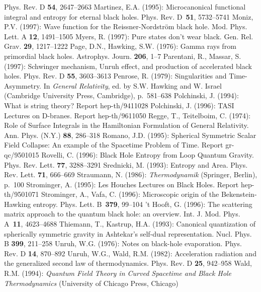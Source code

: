 \documentclass[12pt]{article}
\begin{document}
\begin{thebibliography}{999}
Phys. Rev. D {\bf 54}, 2647--2663
%
\bibitem{}{}{}
Martinez, E.A. (1995): Microcanonical functional integral and
entropy for eternal black holes. Phys. Rev. D~{\bf 51}, 5732--5741
%
\bibitem{}{}{}
Moniz, P.V. (1997): Wave function for the Reissner-Nordstr\"om
black hole. Mod. Phys. Lett. A {\bf 12}, 1491--1505
%
\bibitem{}{}{}
Myers, R. (1997): Pure states don't wear black. 
Gen. Rel. Grav. {\bf 29}, 1217--1222
%
\bibitem{}{}{}
Page, D.N., Hawking, S.W. (1976): Gamma rays from primordial
black holes. Astrophys. Journ. {\bf 206}, 1--7
%
\bibitem{}{}{}
Parentani, R., Massar, S. (1997): Schwinger mechanism, Unruh effect,
and production of accelerated black holes.
Phys. Rev. D {\bf 55}, 3603--3613
%
\bibitem{}{}{}
Penrose, R. (1979): Singularities and Time-Asymmetry.
In {\it General Relativity}, ed. by S.W. Hawking and W. Israel
(Cambridge University Press, Cambridge), p.~581--638
%
\bibitem{}{}{}
Polchinski, J. (1994): What is string theory? Report hep-th/9411028
%
\bibitem{}{}{}
Polchinski, J. (1996): TASI Lectures on D-branes. Report hep-th/9611050
%
\bibitem{}{}{}
Regge, T., Teitelboim, C. (1974): Role of Surface Integrals in the
Hamiltonian Formulation of General Relativity. Ann. Phys. (N.Y.)
{\bf 88}, 286--318
%
\bibitem{}{}{}
Romano, J.D. (1995): Spherical Symmetric Scalar Field Collapse:
An example of the Spacetime Problem of Time. Report gr-qc/9501015
%
\bibitem{}{}{}
Rovelli, C. (1996): Black Hole Entropy from Loop Quantum Gravity.
Phys. Rev. Lett. {\bf 77}, 3288--3291
%
\bibitem{}{}{}
Srednicki, M. (1993): Entropy and Area. Phys. Rev. Lett.
{\bf 71}, 666--669
%
\bibitem{}{}{}
Straumann, N. (1986): {\it Thermodynamik} (Springer, Berlin), p.~100
%
\bibitem{}{}{}
Strominger, A. (1995): Les Houches Lectures on Black Holes.
Report hep-th/9501071
%
\bibitem{}{}{}
Strominger, A., Vafa, C. (1996): Microscopic origin of the
Bekenstein-Hawking entropy. Phys. Lett. B~{\bf 379}, 99--104
%
\bibitem{}{}{}
't Hooft, G. (1996): The scattering matrix approach to the quantum
black hole: an overview. Int. J. Mod. Phys. A~{\bf 11}, 4623--4688
%
\bibitem{}{}{}
Thiemann, T., Kastrup, H.A. (1993): Canonical quantization
of spherically symmetric gravity in Ashtekar's self-dual representation.
Nucl. Phys. B {\bf 399}, 211--258
%
\bibitem{}{}{}
Unruh, W.G. (1976): Notes on black-hole evaporation. Phys. Rev. D {\bf 14},
870--892
%
\bibitem{}{}{}
Unruh, W.G., Wald, R.M. (1982): Acceleration radiation and the
generalized second law of thermodynamics. Phys. Rev. D {\bf 25},
942--958
%
\bibitem{}{}{}
Wald, R.M. (1994): {\it Quantum Field Theory in Curved Spacetime
and Black Hole Thermodynamics} (University of Chicago Press, Chicago)

\end{thebibliography}
\end{document}
